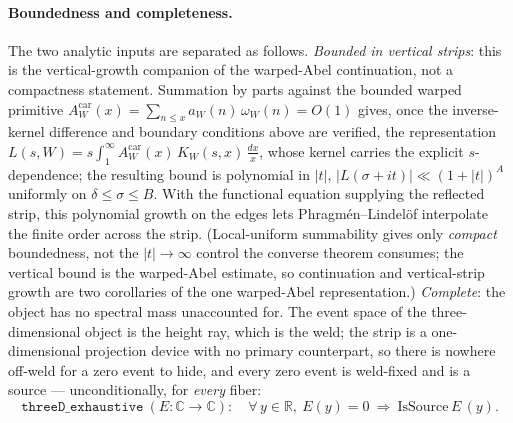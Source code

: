 \documentclass[11pt]{article}
\theoremstyle{definition}
\begin{document}
\paragraph{Boundedness and completeness.} The two analytic inputs are separated as follows.
\emph{Bounded in vertical strips}: this is the vertical-growth companion of the warped-Abel continuation,
not a compactness statement. Summation by parts against the bounded warped primitive
$A^{\mathrm{car}}_W(x)=\sum_{n\le x}a_W(n)\,\omega_W(n)=O(1)$ gives, once the inverse-kernel difference and
boundary conditions above are verified, the representation
$L(s,W)=s\int_1^\infty A^{\mathrm{car}}_W(x)\,K_W(s,x)\,\tfrac{dx}{x}$, whose kernel carries the explicit
$s$-dependence; the resulting bound is polynomial in $|t|$, $|L(\sigma+it)|\ll(1+|t|)^{A}$ uniformly on
$\delta\le\sigma\le B$. With the functional equation supplying the reflected strip, this polynomial growth
on the edges lets Phragm\'en--Lindel\"of \cite[\S5.65]{Titchmarsh} interpolate the finite order across the
strip. (Local-uniform summability gives only \emph{compact} boundedness, not the $|t|\to\infty$ control the
converse theorem consumes; the vertical bound is the warped-Abel estimate, so continuation and
vertical-strip growth are two corollaries of the one warped-Abel representation.)
\emph{Complete}: the object has no spectral mass unaccounted for. The event space of the
three-dimensional object is the height ray, which is the weld; the strip is a one-dimensional
projection device with no primary counterpart, so there is nowhere off-weld for a zero event to hide,
and every zero event is weld-fixed and is a source --- unconditionally, for \emph{every} fiber:
\[
\texttt{threeD\_exhaustive}\ (E:\mathbb C\to\mathbb C):\quad
  \forall\,y\in\mathbb R,\ E(y)=0\ \Rightarrow\ \mathrm{IsSource}\,E\,(y).
\]
\end{document}
